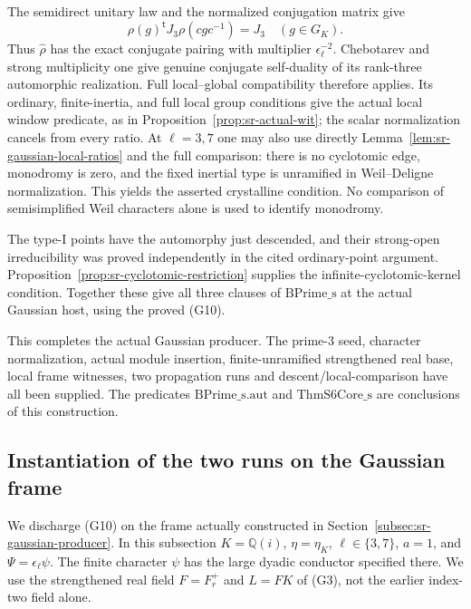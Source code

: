 The semidirect unitary law and the normalized conjugation
matrix give
\[
              \rho(g)^{\mathsf t}J_3\rho(cgc^{-1})=J_3
                           \quad(g\in G_K).
\]
Thus \(\widehat\rho\) has the exact conjugate pairing
with multiplier \(\epsilon_\ell^{-2}\).
Chebotarev and strong multiplicity one give genuine
conjugate self-duality of its rank-three automorphic
realization.
Full local--global compatibility therefore applies.
Its ordinary, finite-inertia, and full local group
conditions give the actual local window predicate,
as in Proposition~\ref{prop:sr-actual-wit};
the scalar normalization cancels from every ratio.
At \(\ell=3,7\) one may also use directly
Lemma~\ref{lem:sr-gaussian-local-ratios} and the
full comparison: there is no cyclotomic edge,
monodromy is zero, and the fixed inertial type is
unramified in Weil--Deligne normalization.
This yields the asserted crystalline condition.
No comparison of semisimplified Weil characters alone
is used to identify monodromy.

The type-I points have the automorphy just descended,
and their strong-open irreducibility was proved
independently in the cited ordinary-point argument.
Proposition~\ref{prop:sr-cyclotomic-restriction} supplies
the infinite-cyclotomic-kernel condition.
Together these give all three clauses of
\(\mathrm{BPrime\_s}\) at the actual Gaussian host,
using the proved (G10).

This completes the actual Gaussian producer.
The prime-\(3\) seed, character normalization, actual
module insertion, finite-unramified strengthened real
base, local frame witnesses, two propagation runs and
descent/local-comparison have all been supplied.
The predicates \(\mathrm{BPrime\_s.aut}\) and
\(\mathrm{ThmS6Core\_s}\) are conclusions of this
construction.


\subsection{Instantiation of the two runs on the Gaussian frame}
\label{subsec:sr-gaussian-actual-two-runs}

We discharge (G10) on the frame actually constructed in
Section~\ref{subsec:sr-gaussian-producer}.
In this subsection \(K=\mathbb Q(i)\),
\(\eta=\eta_K\), \(\ell\in\{3,7\}\), \(a=1\), and
\(\Psi=\epsilon_\ell\psi\).
The finite character \(\psi\) has the large dyadic
conductor specified there.
We use the strengthened real field \(F=F_r^+\)
and \(L=FK\) of (G3), not the earlier index-two
field alone.

